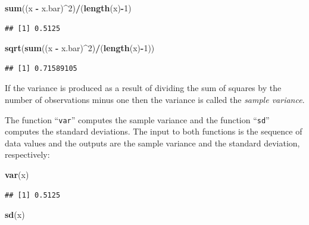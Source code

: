 \documentclass[]{krantz}
\makeatletter
\newenvironment{Shaded}{\begin{snugshade}}{\end{snugshade}}
\newcommand{\DecValTok}[1]{\textcolor[rgb]{0.00,0.00,0.81}{#1}}
\newcommand{\KeywordTok}[1]{\textcolor[rgb]{0.13,0.29,0.53}{\textbf{#1}}}
\newcommand{\NormalTok}[1]{#1}
\newcommand{\OperatorTok}[1]{\textcolor[rgb]{0.81,0.36,0.00}{\textbf{#1}}}
\newcommand{\StringTok}[1]{\textcolor[rgb]{0.31,0.60,0.02}{#1}}
\newenvironment{kframe}{%
\medskip{}
\setlength{\fboxsep}{.8em}
 \def\at@end@of@kframe{}%
 \ifinner\ifhmode%
  \def\at@end@of@kframe{\end{minipage}}%
  \begin{minipage}{\columnwidth}%
 \fi\fi%
 \def\FrameCommand##1{\hskip\@totalleftmargin \hskip-\fboxsep
 \colorbox{shadecolor}{##1}\hskip-\fboxsep
     \hskip-\linewidth \hskip-\@totalleftmargin \hskip\columnwidth}%
 \MakeFramed {\advance\hsize-\width
   \@totalleftmargin\z@ \linewidth\hsize
   \@setminipage}}%
 {\par\unskip\endMakeFramed%
 \at@end@of@kframe}
\renewenvironment{Shaded}{\begin{kframe}}{\end{kframe}}
\theoremstyle{definition}
\theoremstyle{definition}
\theoremstyle{definition}
\theoremstyle{remark}
\makeatother
\begin{document}
\begin{Shaded}
\begin{Highlighting}[]
\KeywordTok{sum}\NormalTok{((x }\OperatorTok{-}\StringTok{ }\NormalTok{x.bar)}\OperatorTok{^}\DecValTok{2}\NormalTok{)}\OperatorTok{/}\NormalTok{(}\KeywordTok{length}\NormalTok{(x)}\OperatorTok{-}\DecValTok{1}\NormalTok{)}
\end{Highlighting}
\end{Shaded}

\begin{verbatim}
## [1] 0.5125
\end{verbatim}

\begin{Shaded}
\begin{Highlighting}[]
\KeywordTok{sqrt}\NormalTok{(}\KeywordTok{sum}\NormalTok{((x }\OperatorTok{-}\StringTok{ }\NormalTok{x.bar)}\OperatorTok{^}\DecValTok{2}\NormalTok{)}\OperatorTok{/}\NormalTok{(}\KeywordTok{length}\NormalTok{(x)}\OperatorTok{-}\DecValTok{1}\NormalTok{))}
\end{Highlighting}
\end{Shaded}

\begin{verbatim}
## [1] 0.71589105
\end{verbatim}

If the variance is produced as a result of dividing the sum of squares
by the number of observations minus one then the variance is called the
\emph{sample variance}.

The function ``\texttt{var}'' computes the sample variance and the function
``\texttt{sd}'' computes the standard deviations. The input to both functions is
the sequence of data values and the outputs are the sample variance and
the standard deviation, respectively:

\begin{Shaded}
\begin{Highlighting}[]
\KeywordTok{var}\NormalTok{(x)}
\end{Highlighting}
\end{Shaded}

\begin{verbatim}
## [1] 0.5125
\end{verbatim}

\begin{Shaded}
\begin{Highlighting}[]
\KeywordTok{sd}\NormalTok{(x)}
\end{Highlighting}
\end{Shaded}
\end{document}
